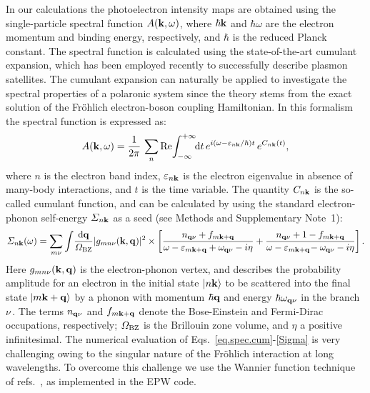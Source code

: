 \documentclass[12pt]{nature}
\def\bk{{\bf k}}
\def\bq{{\bf q}}
\def\ve{\varepsilon}
\begin{document}
In our calculations the photoelectron intensity maps are obtained using the single-particle spectral 
function $A(\bk,\omega)$, where $\hbar\bk$ and $\hbar\omega$ are the electron momentum and binding
energy, respectively, and $\hbar$ is the reduced Planck constant. The spectral function is calculated 
using the state-of-the-art cumulant expansion, which has been employed recently to successfully 
describe plasmon satellites\cite{Aryasetiawan1996,Guzzo2011,Lischner2013,Caruso2015}. 
The cumulant expansion can naturally be applied to investigate the spectral properties of a polaronic 
system since the theory stems from the exact solution of the Fr\"ohlich electron-boson coupling 
Hamiltonian\cite{Langreth1970,Rehr2014}. In this formalism the spectral function is expressed 
as\cite{Hedin1980}:
 \begin{equation} \label{eq.spec.cum}
  A(\bk,\omega) = \frac{1}{2\pi}\,\sum_n {\rm Re}\! \int_{-\infty}^{+\infty}\! \!\mathrm{d}t\,
  e^{i(\omega-\ve_{n\bk}/\hbar) t}\,e^{C_{n\bk}(t)},
 \end{equation}
where $n$ is the electron band index, $\ve_{n\bk}$ is the electron eigenvalue in absence of many-body 
interactions, and $t$ is the time variable. The quantity $C_{n\bk}$ is the so-called cumulant
function, and can be calculated by using the standard electron-phonon self-energy $\varSigma_{n\bk}$ as a seed
(see Methods and Supplementary Note~1):
 \begin{equation} \label{Sigma} 
  \varSigma_{n\bk}(\omega)=\sum_{m\nu}\int \!\frac{\mathrm{d}\bq}{\varOmega_{\rm BZ}} 
  |g_{mn\nu}(\bk,\bq)|^2 \times 
  \left[\frac{n_{\bq\nu}+f_{m\bk+\bq}}{\omega-\ve_{m\bk+\bq}
  +\omega_{\bq\nu}-i\eta} +\frac{n_{\bq\nu}+1-f_{m\bk+\bq}}{\omega-\ve_{m\bk+\bq}\!-
  \omega_{\bq\nu}-i\eta} \right] .
 \end{equation}
Here $g_{mn\nu}(\bk,\bq)$ is the electron-phonon vertex, and describes the probability amplitude for 
an electron in the initial state $|n\bk \rangle$ to be scattered into the final state $|{m\bk+\bq}\rangle$ 
by a phonon with momentum $\hbar\bq$ and energy $\hbar\omega_{\bq\nu}$ in the branch $\nu\,$\cite{GiustinoRMP}. 
The terms $n_{\bq\nu}$ and $f_{m\bk+\bq}$ denote the Bose-Einstein and 
Fermi-Dirac occupations, respectively; $\varOmega_{\rm BZ}$ is the Brillouin zone volume, and $\eta$ 
a positive infinitesimal. The numerical evaluation of Eqs.~\eqref{eq.spec.cum}-\eqref{Sigma} is very 
challenging owing to the singular nature of the Fr\"ohlich interaction at long wavelengths\cite{Frohlich1954}. 
To overcome this challenge we use the Wannier function technique of refs.~, 
as implemented in the EPW code\cite{EPW2016}. 
\end{document}
